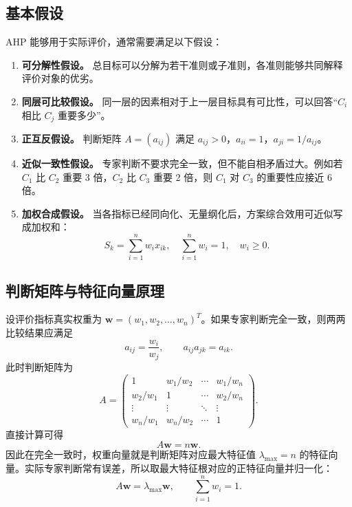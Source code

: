 \documentclass[UTF8,zihao=-4,fontset=none]{ctexart}
\begin{document}
\subsection{基本假设}
AHP 能够用于实际评价，通常需要满足以下假设：
\begin{enumerate}[label=H\arabic*：,leftmargin=3em]
  \item \textbf{可分解性假设。} 总目标可以分解为若干准则或子准则，各准则能够共同解释评价对象的优劣。
  \item \textbf{同层可比较假设。} 同一层的因素相对于上一层目标具有可比性，可以回答“$C_i$ 相比 $C_j$ 重要多少”。
  \item \textbf{正互反假设。} 判断矩阵 $A=(a_{ij})$ 满足 $a_{ij}>0$，$a_{ii}=1$，$a_{ji}=1/a_{ij}$。
  \item \textbf{近似一致性假设。} 专家判断不要求完全一致，但不能自相矛盾过大。例如若 $C_1$ 比 $C_2$ 重要 3 倍，$C_2$ 比 $C_3$ 重要 2 倍，则 $C_1$ 对 $C_3$ 的重要性应接近 6 倍。
  \item \textbf{加权合成假设。} 当各指标已经同向化、无量纲化后，方案综合效用可近似写成加权和：
  \begin{equation}
    S_k=\sum_{i=1}^{n} w_i x_{ik}, \quad \sum_{i=1}^{n}w_i=1,\quad w_i\ge 0 .
  \end{equation}
\end{enumerate}

\subsection{判断矩阵与特征向量原理}
设评价指标真实权重为 $\bm w=(w_1,w_2,\ldots,w_n)^T$。如果专家判断完全一致，则两两比较结果应满足
\begin{equation}
  a_{ij}=\frac{w_i}{w_j},\qquad a_{ij}a_{jk}=a_{ik} .
\end{equation}
此时判断矩阵为
\begin{equation}
A=\begin{pmatrix}
1 & w_1/w_2 & \cdots & w_1/w_n\\
w_2/w_1 & 1 & \cdots & w_2/w_n\\
\vdots & \vdots & \ddots & \vdots\\
w_n/w_1 & w_n/w_2 & \cdots & 1
\end{pmatrix}.
\end{equation}
直接计算可得
\begin{equation}
  A\bm w=n\bm w .
\end{equation}
因此在完全一致时，权重向量就是判断矩阵对应最大特征值 $\lambda_{\max}=n$ 的特征向量。实际专家判断常有误差，所以取最大特征根对应的正特征向量并归一化：
\begin{equation}
  A\bm w=\lambda_{\max}\bm w,
  \qquad \sum_{i=1}^n w_i=1.
\end{equation}
\end{document}
